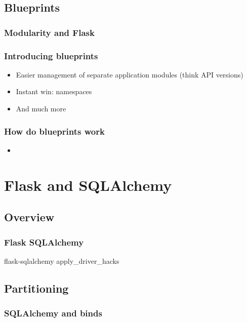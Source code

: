 \documentclass{beamer}
\begin{document}
\subsection{Blueprints}

\begin{frame}
  \frametitle{Modularity and Flask}
\end{frame}

\begin{frame}
  \frametitle{Introducing blueprints}
  \begin{itemize}
  \item Easier management of separate application modules (think API versions)
  \item Instant win: namespaces
  \item And much more
  \end{itemize}
\end{frame}

\begin{frame}
  \frametitle{How do blueprints work}
  \begin{itemize}
  \item
  \end{itemize}

\end{frame}

\section{Flask and SQLAlchemy}

\subsection{Overview}

\begin{frame}
  \frametitle{Flask SQLAlchemy}
  flask-sqlalchemy
  apply\_driver\_hacks
\end{frame}

\subsection{Partitioning}

\begin{frame}
  \frametitle{SQLAlchemy and binds}
\end{frame}
\end{document}
